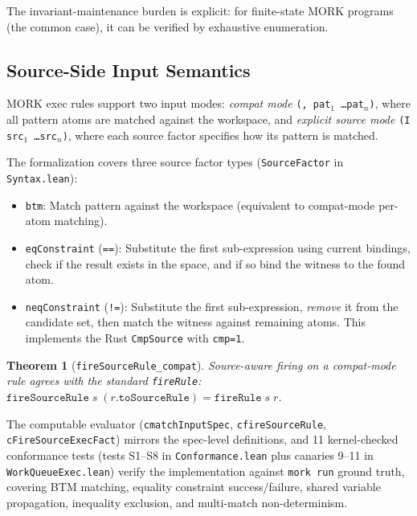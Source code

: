 \documentclass[11pt]{article}
\newtheorem{theorem}{Theorem}[section]
\theoremstyle{definition}
\theoremstyle{remark}
\begin{document}
\noindent
The invariant-maintenance burden is explicit: for finite-state MORK
programs (the common case), it can be verified by exhaustive enumeration.

\subsection{Source-Side Input Semantics}
\label{sec:source}

MORK exec rules support two input modes: \emph{compat mode}
\texttt{(, pat$_1$ \ldots pat$_n$)}, where all pattern atoms are matched
against the workspace, and \emph{explicit source mode}
\texttt{(I src$_1$ \ldots src$_n$)}, where each source factor specifies
how its pattern is matched.

The formalization covers three source factor types
(\texttt{SourceFactor} in \texttt{Syntax.lean}):
\begin{itemize}[nosep]
\item \texttt{btm}: Match pattern against the workspace (equivalent to
  compat-mode per-atom matching).
\item \texttt{eqConstraint} (\texttt{==}): Substitute the first
  sub-expression using current bindings, check if the result exists in
  the space, and if so bind the witness to the found atom.
\item \texttt{neqConstraint} (\texttt{!=}): Substitute the first
  sub-expression, \emph{remove} it from the candidate set, then match
  the witness against remaining atoms.  This implements the Rust
  \texttt{CmpSource} with \texttt{cmp=1}.
\end{itemize}

\begin{theorem}[\texttt{fireSourceRule\_compat}]
Source-aware firing on a compat-mode rule agrees with the standard
\texttt{fireRule}: $\texttt{fireSourceRule}\;s\;(r.\texttt{toSourceRule})
= \texttt{fireRule}\;s\;r$.
\end{theorem}

The computable evaluator (\texttt{cmatchInputSpec},
\texttt{cfireSourceRule}, \texttt{cFireSourceExecFact}) mirrors the
spec-level definitions, and 11 kernel-checked conformance tests
(tests S1--S8 in \texttt{Conformance.lean} plus canaries 9--11 in
\texttt{WorkQueueExec.lean}) verify the implementation against
\texttt{mork run} ground truth, covering BTM matching, equality
constraint success/failure, shared variable propagation,
inequality exclusion, and multi-match non-determinism.

\end{document}
